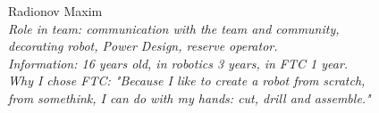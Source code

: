 \begin{figure}[H]
\begin{minipage}[h]{0.47\linewidth}
	\end{minipage}
	\vfill 
	\begin{minipage}[h]{0.47\linewidth}
		Radionov Maxim\\
		\emph{Role in team: communication with the team and community, decorating robot, Power Design, reserve operator. \\  }
		\emph{Information: 16 years old, in robotics 3 years, in FTC 1 year. \\}
		\emph{Why I chose FTC: "Because I like to create a robot from scratch, from somethink, I can do with my hands: cut, drill and assemble."}					
	\end{minipage}
	\hfill
	\begin{minipage}[h]{0.47\linewidth}
		\\
	\end{minipage}

\end{figure}
